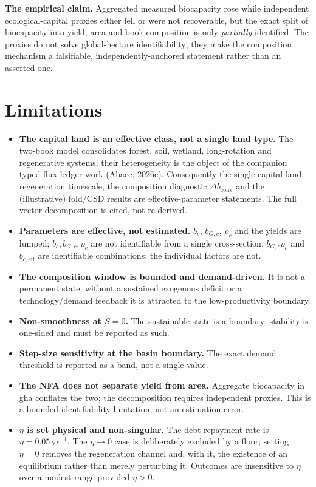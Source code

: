 \documentclass[11pt]{article}
\begin{document}
\noindent\textbf{The empirical claim.} Aggregated measured biocapacity rose while independent
ecological-capital proxies either fell or were not recoverable, but the exact split of biocapacity into yield,
area and book composition is only \emph{partially} identified. The proxies do not solve global-hectare
identifiability; they make the composition mechanism a falsifiable, independently-anchored statement rather
than an asserted one.

\section{Limitations}

\begin{itemize}
\item \textbf{The capital land is an effective class, not a single land type.} The two-book model consolidates forest, soil, wetland, long-rotation and regenerative systems; their heterogeneity is the object of the companion typed-flux-ledger work (Abaee, 2026c). Consequently the single capital-land regeneration timescale, the composition diagnostic $\Delta b_{\mathrm{conv}}$ and the (illustrative) fold/CSD results are effective-parameter statements. The full vector decomposition is cited, not re-derived.
\item \textbf{Parameters are effective, not estimated.} $b_c$, $b_{G,c}$, $\rho_c$ and the yields are lumped; $b_c,b_{G,c},\rho_c$ are not identifiable from a single cross-section. $b_{G,c}\rho_c$ and $b_{c,\mathrm{eff}}$ are identifiable combinations; the individual factors are not.
\item \textbf{The composition window is bounded and demand-driven.} It is not a permanent state; without a sustained exogenous deficit or a technology/demand feedback it is attracted to the low-productivity boundary.
\item \textbf{Non-smoothness at $S=0$.} The sustainable state is a boundary; stability is one-sided and must be reported as such.
\item \textbf{Step-size sensitivity at the basin boundary.} The exact demand threshold is reported as a band, not a single value.
\item \textbf{The NFA does not separate yield from area.} Aggregate biocapacity in gha conflates the two; the decomposition requires independent proxies. This is a bounded-identifiability limitation, not an estimation error.
\item \textbf{$\eta$ is set physical and non-singular.} The debt-repayment rate is $\eta=0.05\,\text{yr}^{-1}$. The $\eta\to0$ case is deliberately excluded by a floor; setting $\eta=0$ removes the regeneration channel and, with it, the existence of an equilibrium rather than merely perturbing it. Outcomes are insensitive to $\eta$ over a modest range provided $\eta>0$.

\end{itemize}
\end{document}
